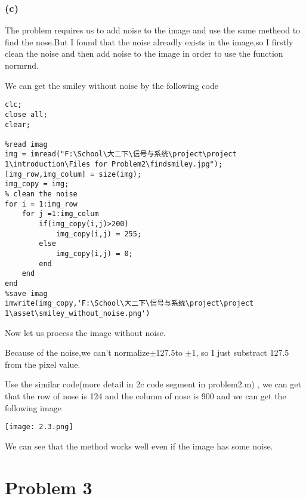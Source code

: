 \documentclass{article}
\begin{document}
\subsubsection*{(c)}
The problem requires us to add noise to the image and 
use the same metheod to find the nose.But I found that 
the noise alreadly exists in the image,so I firstly clean 
the noise and then add noise to the image in order to 
use the function normrnd.\par
We can get the smiley without noise by the following code
\begin{lstlisting}
clc;
close all;
clear;

%read imag
img = imread("F:\School\大二下\信号与系统\project\project 1\introduction\Files for Problem2\findsmiley.jpg");
[img_row,img_colum] = size(img);
img_copy = img;
% clean the noise
for i = 1:img_row
    for j =1:img_colum
        if(img_copy(i,j)>200)
            img_copy(i,j) = 255;
        else
            img_copy(i,j) = 0;
        end
    end
end
%save imag
imwrite(img_copy,'F:\School\大二下\信号与系统\project\project 1\asset\smiley_without_noise.png')
\end{lstlisting}
Now let us process the image without noise.\par
Because of the noise,we can't normalize$\pm 127.5$to $\pm 1$,
so I just substract 127.5 from the pixel value.\par
Use the similar code(more detail in 2c code segment in problem2.m) ,
we can get that the row of nose is 124 and
the column of nose is 900 and we can get the following image
\begin{center}
    \texttt{[image: 2.3.png]}
\end{center}
We can see that the method works well even if the image has some noise.
\newpage
\section{Problem 3}
\end{document}
